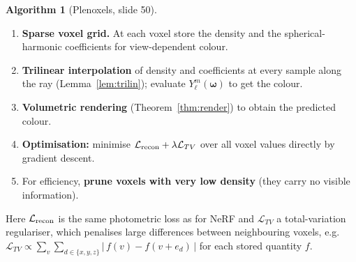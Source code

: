\documentclass[11pt,a4paper]{article}
\newcommand{\om}{\boldsymbol{\omega}}
\theoremstyle{definition}
\newtheorem{algorithm}{Algorithm}[section]
\theoremstyle{plain}
\begin{document}
\begin{algorithm}[Plenoxels, slide 50]\label{alg:plenox}
\begin{enumerate}[nosep]
\item \textbf{Sparse voxel grid.} At each voxel store the density and the spherical-harmonic coefficients for view-dependent colour.
\item \textbf{Trilinear interpolation} of density and coefficients at every sample along the ray (Lemma~\ref{lem:trilin}); evaluate $Y_\ell^m(\om)$ to get the colour.
\item \textbf{Volumetric rendering} (Theorem~\ref{thm:render}) to obtain the predicted colour.
\item \textbf{Optimisation:} minimise $\mathcal L_{\rm recon}+\lambda\mathcal L_{TV}$ over all voxel values directly by gradient descent.
\item For efficiency, \textbf{prune voxels with very low density} (they carry no visible information).
\end{enumerate}
\end{algorithm}

Here $\mathcal L_{\rm recon}$ is the same photometric loss as for NeRF and $\mathcal L_{TV}$ a total-variation regulariser, which penalises large differences between neighbouring voxels, e.g.\ $\mathcal L_{TV}\propto\sum_{v}\sum_{d\in\{x,y,z\}}|\,f(v)-f(v+e_d)\,|$ for each stored quantity $f$.
\end{document}
